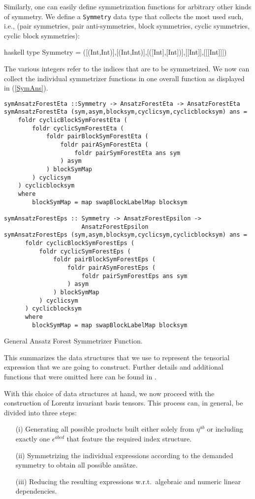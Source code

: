 Similarly, one can easily define symmetrization functions for arbitrary other kinds of symmetry. We define a \texttt{Symmetry} data type that collects the most used such, i.e., (pair symmetries, pair anti-symmetries, block symmetries, cyclic symmetries, cyclic block symmetries):
\begin{center}
\begin{cminted}{haskell}
type Symmetry = ([(Int,Int)],[(Int,Int)],[([Int],[Int])],[[Int]],[[[Int]]])
\end{cminted}
\end{center}
The various integers refer to the indices that are to be symmetrized. We now can collect the individual symmetrizer functions in one overall function as displayed in (\ref{SymAns}).
\begin{listing}[hbt!] 
\begin{verbatim}
symAnsatzForestEta ::Symmetry -> AnsatzForestEta -> AnsatzForestEta
symAnsatzForestEta (sym,asym,blocksym,cyclicsym,cyclicblocksym) ans =
    foldr cyclicBlockSymForestEta (
        foldr cyclicSymForestEta (
            foldr pairBlockSymForestEta (
                foldr pairASymForestEta (
                    foldr pairSymForestEta ans sym
                ) asym
            ) blockSymMap
        ) cyclicsym
    ) cyclicblocksym
    where
        blockSymMap = map swapBlockLabelMap blocksym

symAnsatzForestEps :: Symmetry -> AnsatzForestEpsilon ->
                      AnsatzForestEpsilon
symAnsatzForestEps (sym,asym,blocksym,cyclicsym,cyclicblocksym) ans =
      foldr cyclicBlockSymForestEps (
          foldr cyclicSymForestEps (
              foldr pairBlockSymForestEps (
                  foldr pairASymForestEps (
                      foldr pairSymForestEps ans sym
                  ) asym
              ) blockSymMap
          ) cyclicsym
      ) cyclicblocksym
      where
        blockSymMap = map swapBlockLabelMap blocksym
\end{verbatim} 
\caption{General Ansatz Forest Symmetrizer Function.}\label{SymAns}
\end{listing}

This summarizes the data structures that we use to represent the tensorial expression that we are going to construct. Further details and additional functions that were omitted here can be found in \cite{sparse-tensor}.  

With this choice of data structures at hand, we now proceed with the construction of Lorentz invariant basis tensors.  
This process can, in general, be divided into three steps:
\begin{itemize}
    \item[(i)] Generating all possible products built either solely from $\eta^{ab}$ or including exactly one $\epsilon^{abcd}$ that feature the required index structure.
    \item[(ii)] Symmetrizing the individual expressions according to the demanded symmetry to obtain all possible ansätze.
    \item[(iii)] Reducing the resulting expressions w.r.t.\ algebraic and numeric linear dependencies.
\end{itemize}

